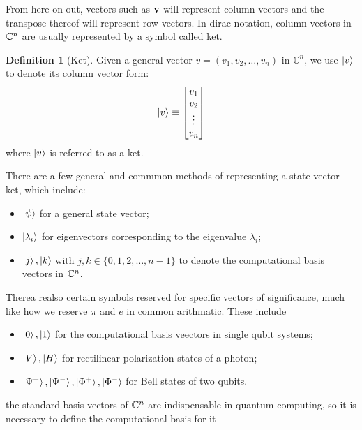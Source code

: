 \documentclass[12pt]{article}
\theoremstyle{definition}
\newtheorem{definition}[theorem]{Definition}
\begin{document}
From here on out, vectors such as $\mathbf{v}$ will represent column vectors and the transpose thereof will represent row vectors. In dirac notation, column vectors in $\mathbb{C}^n$ are usually represented by a symbol called ket. 

\begin{definition}[Ket]
    Given a general vector $v = (v_1, v_2, \ldots, v_n)$ in $\mathbb{C}^n$, we use $\ket{v}$ to denote its column vector form:
    \[
    \ket{v} \equiv \begin{bmatrix}
    v_1 \\
    v_2 \\
    \vdots \\
    v_n
    \end{bmatrix}
    \]
    where $\ket{v}$ is referred to as a ket.
\end{definition}

There are a few general and commmon methods of representing a state vector ket, which include:

\begin{itemize}
    \item $\ket{\psi}$ for a general state vector;
    \item $\ket{\lambda_i}$ for eigenvectors corresponding to the eigenvalue $\lambda_i$;
    \item $\ket{j}, \ket{k}$ with $j, k \in \{0, 1, 2, \ldots, n - 1 \}$ to denote the computational basis vectors in $\mathbb{C}^n$.
\end{itemize}

Therea realso certain symbols reserved for specific vectors of significance, much like how we reserve $\pi$ and $e$ in common arithmatic. These include

\begin{itemize}
    \item $\ket{0}, \ket{1}$ for the computational basis veectors in single qubit systems;
    \item $\ket{V}, \ket{H}$ for rectilinear polarization states of a photon;
    \item $\ket{\Psi^+}, \ket{\Psi^-}, \ket{\Phi^+}, \ket{\Phi^-}$ for Bell states of two qubits. 
\end{itemize}

the standard basis vectors of $\mathbb{C}^n$ are indispensable in quantum computing, so it is necessary to define the computational basis for it
\end{document}
